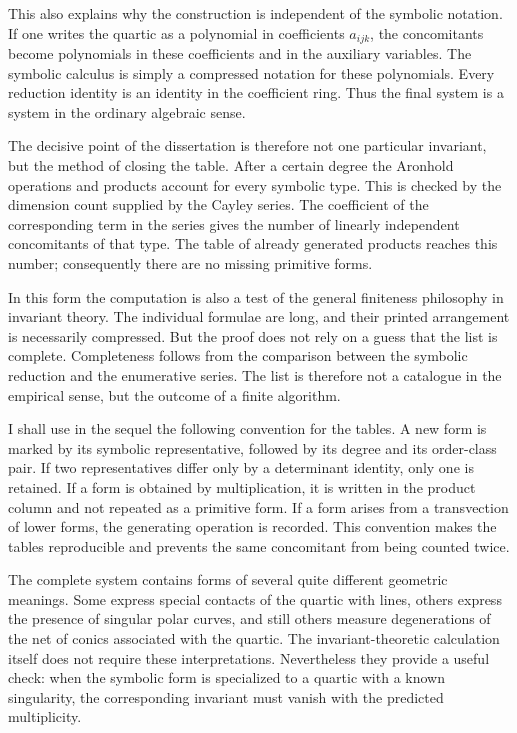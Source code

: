 \documentclass[11pt]{article}
\begin{document}
This also explains why the construction is independent of the symbolic notation. If one writes the
quartic as a polynomial in coefficients \(a_{ijk}\), the concomitants become polynomials in these
coefficients and in the auxiliary variables. The symbolic calculus is simply a compressed notation
for these polynomials. Every reduction identity is an identity in the coefficient ring. Thus the
final system is a system in the ordinary algebraic sense.


The decisive point of the dissertation is therefore not one particular invariant, but the method of
closing the table. After a certain degree the Aronhold operations and products account for every
symbolic type. This is checked by the dimension count supplied by the Cayley series. The coefficient
of the corresponding term in the series gives the number of linearly independent concomitants of
that type. The table of already generated products reaches this number; consequently there are no
missing primitive forms.


In this form the computation is also a test of the general finiteness philosophy in invariant
theory. The individual formulae are long, and their printed arrangement is necessarily compressed.
But the proof does not rely on a guess that the list is complete. Completeness follows from the
comparison between the symbolic reduction and the enumerative series. The list is therefore not a
catalogue in the empirical sense, but the outcome of a finite algorithm.


I shall use in the sequel the following convention for the tables. A new form is marked by its
symbolic representative, followed by its degree and its order-class pair. If two representatives
differ only by a determinant identity, only one is retained. If a form is obtained by
multiplication, it is written in the product column and not repeated as a primitive form. If a form
arises from a transvection of lower forms, the generating operation is recorded. This convention
makes the tables reproducible and prevents the same concomitant from being counted twice.


The complete system contains forms of several quite different geometric meanings. Some express
special contacts of the quartic with lines, others express the presence of singular polar curves,
and still others measure degenerations of the net of conics associated with the quartic. The
invariant-theoretic calculation itself does not require these interpretations. Nevertheless they
provide a useful check: when the symbolic form is specialized to a quartic with a known singularity,
the corresponding invariant must vanish with the predicted multiplicity.
\end{document}

